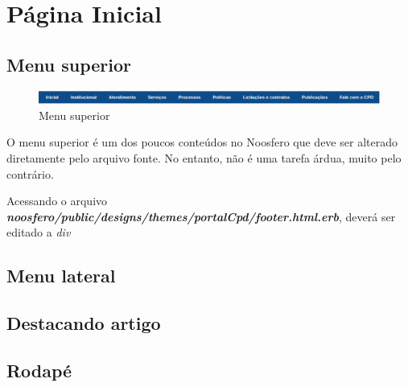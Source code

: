 \chapter{Página Inicial}
\label{chap:paginaInicial}


\section{Menu superior}
\begin{figure}[h]
     \centering
       \includegraphics[keepaspectratio=true,scale=0.49]{figuras/menu_superior}
     \caption{Menu superior}
\end{figure}

O menu superior é um dos poucos conteúdos no Noosfero que deve ser alterado 
diretamente pelo arquivo fonte. No entanto, não é uma tarefa árdua, muito pelo
contrário.

Acessando o arquivo \textbf{\textit{noosfero/public/designs/themes/portalCpd/footer.html.erb}},
deverá ser editado a \textit{div} 

\section{Menu lateral}

\section{Destacando artigo}

\section{Rodapé}